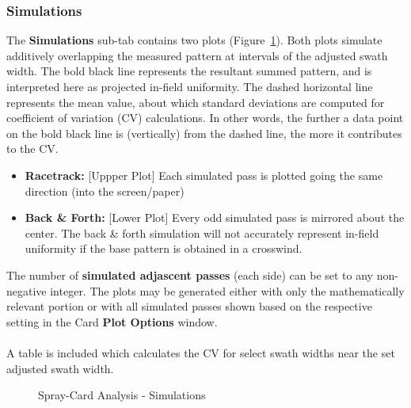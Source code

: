 \documentclass[10pt,letterpaper,titlepage]{article}
\begin{document}
    \subsubsection{Simulations}
    The \textbf{Simulations} sub-tab contains two plots (Figure~\ref{fig:card_simulations}). Both plots simulate additively overlapping the measured pattern at intervals of the adjusted swath width. The bold black line represents the resultant summed pattern, and is interpreted here as projected in-field uniformity. The dashed horizontal line represents the mean value, about which standard deviations are computed for coefficient of variation (CV) calculations. In other words, the further a data point on the bold black line is (vertically) from the dashed line, the more it contributes to the CV.
    \begin{itemize}
        \item \textbf{Racetrack:} [Uppper Plot] Each simulated pass is plotted going the same direction (into the screen/paper)
        \item \textbf{Back \& Forth:} [Lower Plot] Every odd simulated pass is mirrored about the center. \color{red} The back \& forth simulation will not accurately represent in-field uniformity if the base pattern is obtained in a crosswind. \color{black}
    \end{itemize}
    The number of \textbf{simulated adjascent passes} (each side) can be set to any non-negative integer. The plots may be generated either with only the mathematically relevant portion or with all simulated passes shown based on the respective setting in the Card \textbf{Plot Options} window.
    \\\\
    A table is included which calculates the CV for select swath widths near the set adjusted swath width.

    \begin{figure}[hb]
        \centering
        \caption{Spray-Card Analysis - Simulations}
        \label{fig:card_simulations}
    \end{figure}
    \newpage
\end{document}
